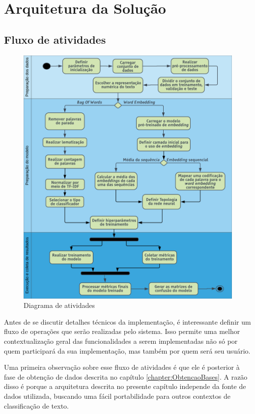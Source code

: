 \chapter{Arquitetura da Solução}
\label{chapter:Arquitetura}
\noindent

\section{Fluxo de atividades}

\begin{figure}[!ht]
	\centering
	\includegraphics[width=1.1\textwidth]{figures/ActivityDiagram.png}
	\caption{Diagrama de atividades}
	\label{fig:ActivityDiagram}
\end{figure}

Antes de se discutir detalhes técnicos da implementação, é interessante definir um fluxo de operações que serão realizadas pelo sistema. Isso permite uma melhor contextualização geral das funcionalidades a serem implementadas não só por quem participará da sua implementação, mas também por quem será seu usuário.

Uma primeira observação sobre esse fluxo de atividades é que ele é posterior à fase de obtenção de dados descrita no capítulo \ref{chapter:ObtencaoBases}. A razão disso é porque a arquitetura descrita no presente capítulo independe da fonte de dados utilizada, buscando uma fácil portabilidade para outros contextos de classificação de texto.

